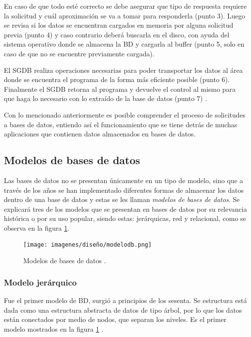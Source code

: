 \par
En caso de que todo esté correcto se debe asegurar que tipo de respuesta requiere la solicitud y cuál aproximación se va a tomar para responderla (punto 3). Luego se revisa si los datos se encuentran cargados en memoria por alguna solicitud previa (punto 4) y caso contrario deberá buscarla en el disco, con ayuda del sistema operativo donde se almacena la BD y cargarla al buffer (punto 5, solo en caso de que no se encuentre previamente cargada)\cite{camps_paré_2005}.
\par
El SGDB realiza operaciones necesarias para poder transportar los datos al área donde se encuentra el programa de la forma más eficiente posible (punto 6). Finalmente el SGDB retorna al programa y devuelve el control al mismo para que haga lo necesario con lo extraído de la base de datos (punto 7) \cite{camps_paré_2005}. 
\par
Con lo mencionado anteriormente es posible comprender el proceso de solicitudes a bases de datos, entiendo así el funcionamiento que se tiene detrás de muchas aplicaciones que contienen datos almacenados en bases de datos.


\subsection{Modelos de bases de datos}
\par
Las bases de datos no se presentan únicamente en un tipo de modelo, sino que a través de los años se han implementado diferentes formas de almacenar los datos dentro de una base de datos y estas se les llaman \textit{modelos de bases de datos}. Se explicará tres de los modelos que se presentan en bases de datos por su relevancia histórica o por su uso popular, siendo estas: jerárquicas, red y relacional, como se observa en la figura \ref{BDmodels}.
\begin{figure}[H]
    \centering
    \texttt{[image: imagenes/diseño/modelodb.png]}
    \caption{Modelos de bases de datos \cite{camps_paré_2005}.}
    \label{BDmodels}
\end{figure}

\subsubsection{Modelo jerárquico}
\par
Fue el primer modelo de BD, surgió a principios de los sesenta. Se estructura está dada como una estructura abstracta de datos de tipo árbol, por lo que los datos están conectados por medio de nodos, que separan los niveles. Es el primer modelo mostrados en la figura \ref{BDmodels} \cite{camps_paré_2005}.


